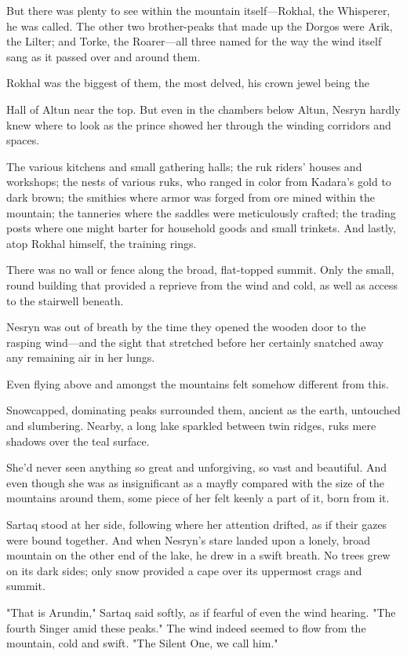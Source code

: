 But there was plenty to see within the mountain itself---Rokhal, the Whisperer, he was called. The other two brother-peaks that made up the Dorgos were Arik, the Lilter; and Torke, the Roarer---all three named for the way the wind itself sang as it passed over and around them.

Rokhal was the biggest of them, the most delved, his crown jewel being the

Hall of Altun near the top. But even in the chambers below Altun, Nesryn hardly knew where to look as the prince showed her through the winding corridors and spaces.

The various kitchens and small gathering halls; the ruk riders' houses and workshops; the nests of various ruks, who ranged in color from Kadara's gold to dark brown; the smithies where armor was forged from ore mined within the mountain; the tanneries where the saddles were meticulously crafted; the trading posts where one might barter for household goods and small trinkets. And lastly, atop Rokhal himself, the training rings.

There was no wall or fence along the broad, flat-topped summit. Only the small, round building that provided a reprieve from the wind and cold, as well as access to the stairwell beneath.

Nesryn was out of breath by the time they opened the wooden door to the rasping wind---and the sight that stretched before her certainly snatched away any remaining air in her lungs.

Even flying above and amongst the mountains felt somehow different from this.

Snowcapped, dominating peaks surrounded them, ancient as the earth, untouched and slumbering. Nearby, a long lake sparkled between twin ridges, ruks mere shadows over the teal surface.

She'd never seen anything so great and unforgiving, so vast and beautiful. And even though she was as insignificant as a mayfly compared with the size of the mountains around them, some piece of her felt keenly a part of it, born from it.

Sartaq stood at her side, following where her attention drifted, as if their gazes were bound together. And when Nesryn's stare landed upon a lonely, broad mountain on the other end of the lake, he drew in a swift breath. No trees grew on its dark sides; only snow provided a cape over its uppermost crags and summit.

"That is Arundin," Sartaq said softly, as if fearful of even the wind hearing. "The fourth Singer amid these peaks." The wind indeed seemed to flow from the mountain, cold and swift. "The Silent One, we call him."

